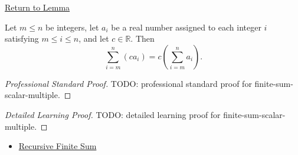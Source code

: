 \newpage
{}
\label{prf:finite-sum-scalar-multiple}

\begin{remark*}[Return]
\hyperref[lem:finite-sum-scalar-multiple]{Return to Lemma}
\end{remark*}

\begin{lemma*}
Let \(m \le n\) be integers, let \(a_i\) be a real number assigned to
each integer \(i\) satisfying \(m \le i \le n\), and let
\(c \in \mathbb{R}\). Then
\[
  \sum_{i=m}^{n} (c a_i)
  =
  c\left(\sum_{i=m}^{n} a_i\right).
\]
\end{lemma*}

\begin{proof}[Professional Standard Proof]
\LRAProofBodyStart
TODO: professional standard proof for finite-sum-scalar-multiple.
\end{proof}

\begin{proof}[Detailed Learning Proof]
\LRAProofBodyStart
TODO: detailed learning proof for finite-sum-scalar-multiple.
\end{proof}

\begin{remark*}
\end{remark*}

\begin{dependencies}
\begin{itemize}
  \item \hyperref[def:recursive-finite-sum]{Recursive Finite Sum}
\end{itemize}
\end{dependencies}

\clearpage
